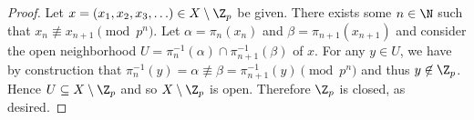 \documentclass[10pt]{amsart}
\begin{document}
\begin{thm}
\begin{proof}
    Let $x = (x_1, x_2, x_3, \ldots) \in X \setminus \Z_p$ be given.
    There exists some $n \in \N$ such that $x_n \not \equiv x_{n+1} \pmod{p^n}$.
    Let $\alpha = \pi_n(x_n)$ and $\beta = \pi_{n+1}(x_{n+1})$ and consider the open neighborhood $U = \pi_n^{-1}(\alpha) \cap \pi_{n+1}^{-1}(\beta)$ of $x$.
    For any $y \in U$, we have by construction that $\pi_n^{-1}(y) = \alpha \not \equiv \beta = \pi_{n+1}^{-1}(y) \pmod{p^n}$ and thus $y \not \in \Z_p$.
    Hence $U \subseteq X \setminus \Z_p$ and so $X \setminus \Z_p$ is open.
    Therefore $\Z_p$ is closed, as desired.
    
  \end{proof}
\end{thm}
\end{document}
